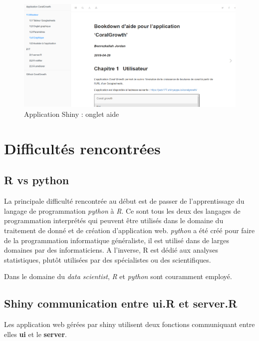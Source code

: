 \documentclass[]{report}
\begin{document}
\begin{figure}[h!]
\includegraphics[]{../image/aide.PNG}
\caption{Application Shiny : onglet aide}
\end{figure}

\null
\newpage

\section{Difficultés rencontrées}\label{difficultes-rencontrees}

\subsection{R vs python}\label{r-vs-python}

La principale difficulté rencontrée au début est de passer de
l'apprentissage du langage de programmation \emph{python} à \emph{R}. Ce
sont tous les deux des langages de programmation interprétés qui peuvent
être utilisés dans le domaine du traitement de donné et de création
d'application web. \emph{python} a été créé pour faire de la
programmation informatique généraliste, il est utilisé dans de larges
domaines par des informaticiens. A l'inverse, R est dédié aux analyses
statistiques, plutôt utilisées par des spécialistes ou des
scientifiques.

Dans le domaine du \emph{data scientist}, \emph{R} et \emph{python} sont
couramment employé.

\subsection{Shiny communication entre ui.R et
server.R}\label{shiny-communication-entre-ui.r-et-server.r}

Les application web gérées par shiny utilisent deux fonctions
communiquant entre elles \textbf{ui} et le \textbf{server}.
\end{document}
